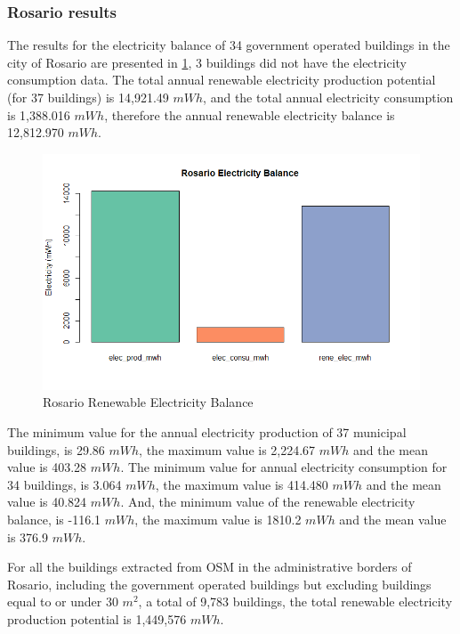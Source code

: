 \documentclass[
]{book}
\begin{document}
\hypertarget{rosario-results}{%
\subsubsection*{Rosario results}\label{rosario-results}}

The results for the electricity balance of 34 government operated buildings in the city of Rosario are presented in \ref{fig:img-229}, 3 buildings did not have the electricity consumption data. The total annual renewable electricity production potential (for 37 buildings) is 14,921.49 \(mWh\), and the total annual electricity consumption is 1,388.016 \(mWh\), therefore the annual renewable electricity balance is 12,812.970 \(mWh\).

\begin{figure}

{\centering \includegraphics[width=1\linewidth]{images/ros_elec_balance} 

}

\caption{Rosario Renewable Electricity Balance}\label{fig:img-229}
\end{figure}

The minimum value for the annual electricity production of 37 municipal buildings, is 29.86 \(mWh\), the maximum value is 2,224.67 \(mWh\) and the mean value is 403.28 \(mWh\). The minimum value for annual electricity consumption for 34 buildings, is 3.064 \(mWh\), the maximum value is 414.480 \(mWh\) and the mean value is 40.824 \(mWh\). And, the minimum value of the renewable electricity balance, is -116.1 \(mWh\), the maximum value is 1810.2 \(mWh\) and the mean value is 376.9 \(mWh\).

For all the buildings extracted from OSM in the administrative borders of Rosario, including the government operated buildings but excluding buildings equal to or under 30 \(m^2\), a total of 9,783 buildings, the total renewable electricity production potential is 1,449,576 \(mWh\).
\end{document}
